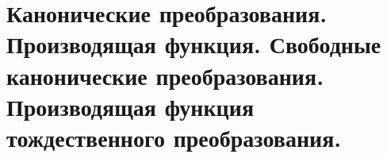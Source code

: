 \section{Канонические преобразования. Производящая функция. Свободные канонические преобразования. Производящая функция тождественного преобразования.}\label{chasec21}



\newpage